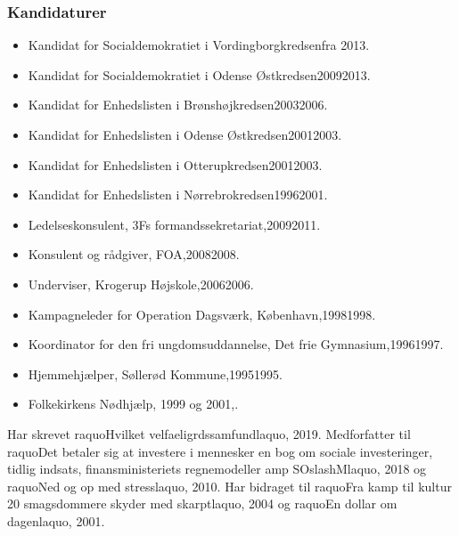\documentclass[11pt, a4paper]{awesome-cv}
\begin{document}
\begin{cvletter}
\subsubsection*{Kandidaturer}
\begin{itemize}
\item Kandidat for Socialdemokratiet i Vordingborgkredsenfra 2013.
\item Kandidat for Socialdemokratiet i Odense Østkredsen20092013.
\item Kandidat for Enhedslisten i Brønshøjkredsen20032006.
\item Kandidat for Enhedslisten i Odense Østkredsen20012003.
\item Kandidat for Enhedslisten i Otterupkredsen20012003.
\item Kandidat for Enhedslisten i Nørrebrokredsen19962001.
\end{itemize}
\begin{itemize}
\item Ledelseskonsulent, 3Fs formandssekretariat,20092011.
\item Konsulent og rådgiver, FOA,20082008.
\item Underviser, Krogerup Højskole,20062006.
\item Kampagneleder for Operation Dagsværk, København,19981998.
\item Koordinator for den fri ungdomsuddannelse, Det frie Gymnasium,19961997.
\item Hjemmehjælper, Søllerød Kommune,19951995.
\item Folkekirkens Nødhjælp, 1999 og 2001,.
\end{itemize}
Har skrevet raquoHvilket velfaeligrdssamfundlaquo, 2019. Medforfatter til raquoDet betaler sig at investere i mennesker  en bog om sociale investeringer, tidlig indsats, finansministeriets regnemodeller amp SOslashMlaquo, 2018 og raquoNed og op med stresslaquo, 2010. Har bidraget til raquoFra kamp til kultur  20 smagsdommere skyder med skarptlaquo, 2004 og raquoEn dollar om dagenlaquo, 2001.

\end{cvletter}
\end{document}
